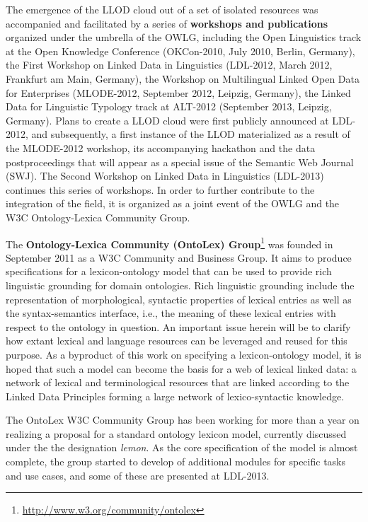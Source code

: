 The emergence of the LLOD cloud out of a set of isolated resources was accompanied and facilitated by a series of \textbf{workshops and publications} organized under the umbrella of the OWLG, including the Open Linguistics track at the Open Knowledge Conference (OKCon-2010, July 2010, Berlin, Germany), the First Workshop on Linked Data in Linguistics (LDL-2012, March 2012, Frankfurt am Main, Germany), the Workshop on Multilingual Linked Open Data for Enterprises (MLODE-2012, September 2012, Leipzig, Germany), the Linked Data for Linguistic Typology track at ALT-2012 (September 2013, Leipzig, Germany). Plans to create a LLOD cloud were first publicly announced at LDL-2012, and subsequently, a first instance of the LLOD materialized as a result of the MLODE-2012 workshop, its accompanying hackathon and the data postproceedings that will appear as a special issue of the Semantic Web Journal (SWJ). The Second Workshop on Linked Data in Linguistics (LDL-2013) continues this series of workshops. In order to further contribute to the integration of the field, it is organized as a joint event of the OWLG and the W3C Ontology-Lexica Community Group.

The \textbf{Ontology-Lexica Community (OntoLex) Group}\footnote{\url{http://www.w3.org/community/ontolex}} was founded  in September 2011 as a W3C Community and Business Group. It aims to produce specifications for a lexicon-ontology model that can be used to provide rich linguistic grounding for domain ontologies.
Rich linguistic grounding include the representation of morphological, syntactic properties of lexical entries as well as the syntax-semantics interface, i.e., the meaning of these lexical entries with respect to the ontology in question. An important issue herein will be to clarify how extant lexical and language resources can be leveraged and reused for this purpose. As a byproduct of this work on specifying a lexicon-ontology model, it is hoped that such a model can become the basis for a web of lexical linked data: a network of lexical and terminological resources that are linked according to the Linked Data Principles forming a large network of lexico-syntactic knowledge.

The OntoLex W3C Community Group has been working for more than a year on realizing a proposal for a standard ontology lexicon model, currently discussed under the the designation \emph{lemon}. As the core specification of the model is almost complete, the group started to develop of additional modules for specific tasks and use cases, and some of these are presented at LDL-2013.

